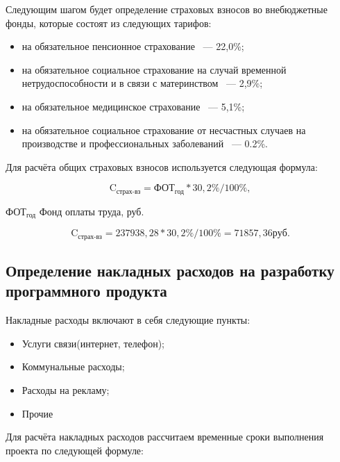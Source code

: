 Следующим шагом будет определение страховых взносов во внебюджетные фонды, которые состоят
из следующих тарифов:

\begin{itemize}
    \item на обязательное пенсионное страхование ~--- 22,0\%;
    \item на обязательное социальное страхование на случай временной нетрудоспособности и в связи с материнством ~--- 2,9\%;
    \item на обязательное медицинское страхование ~--- 5,1\%;
    \item на обязательное социальное страхование от несчастных случаев на производстве и профессиональных заболеваний ~--- 0.2\%.
\end{itemize}

Для расчёта общих страховых взносов используется следующая формула:

\begin{equation}
    \text{C}_\text{страх-вз} = \text{ФОТ}_\text{год} * 30,2\% / 100\%,
\end{equation}

\begin{eqexpl}[25mm]
    \item{$\text{ФОТ}_\text{год}$} Фонд оплаты труда, руб.
\end{eqexpl}

\begin{equation*}
    \text{C}_\text{страх-вз} = 237938,28 * 30,2\% / 100\% = 71857,36 руб.
\end{equation*}

\tocless\subsection{Определение накладных расходов на разработку программного продукта}

Накладные расходы включают в себя следующие пункты:

\begin{itemize}
    \item Услуги связи(интернет, телефон);
    \item Коммунальные расходы;
    \item Расходы на рекламу;
    \item Прочие
\end{itemize}

Для расчёта накладных расходов рассчитаем временные сроки выполнения проекта по следующей
формуле:

